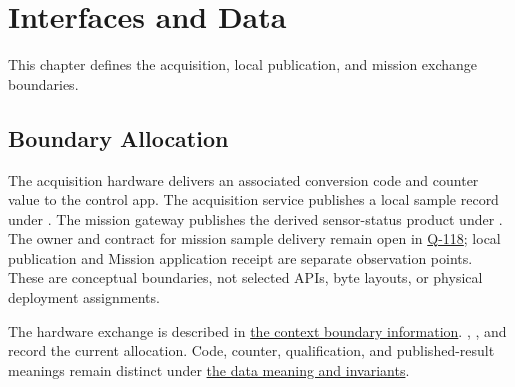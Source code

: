 \chapter{Interfaces and Data}
\label{Section:InterfacesResponsibility}
This chapter defines the acquisition, local publication, and mission exchange boundaries.


\section{Boundary Allocation}
The acquisition hardware delivers an associated conversion code and counter
value to the control app. The acquisition service publishes a local sample
record under . The mission gateway publishes the
derived sensor-status product under .
The owner and contract for mission sample delivery remain open in
\hyperref[Question:Q-118]{Q-118}; local publication and Mission application
receipt are separate observation points. These are conceptual boundaries,
not selected APIs, byte layouts, or physical deployment assignments.

The hardware exchange is described in
\hyperref[Section:ContextBoundaryInformation]{the context boundary information}.
, , and
 record the current allocation. Code, counter,
qualification, and published-result meanings remain distinct under
\hyperref[Section:DataMeaning]{the data meaning and invariants}.

